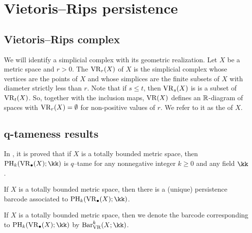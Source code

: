 
\section{Vietoris--Rips persistence}\label{s:preliminaries}


\subsection{Vietoris--Rips complex}\label{ss:vietoris-rips}

We will identify a simplicial complex with its geometric realization.
Let $X$ be a metric space and $r > 0$.
The  $\operatorname{VR}_r(X)$ of $X$ is the simplicial complex whose vertices are the points of $X$ and whose simplices are the finite subsets of $X$ with diameter strictly less than $r$.
Note that if $s \leq t$, then $\operatorname{VR}_s(X)$ is is a subset of $\operatorname{VR}_t(X)$.
So, together with the inclusion maps, $\operatorname{VR}(X)$ defines an $\mathbb{R}$-diagram of spaces with $\operatorname{VR}_r(X) = \emptyset$ for non-positive values of $r$.
We refer to it as the  of $X$.

\subsection{q-tameness results}

\begin{remark}
	In \cite{bib11}, it is proved that if $X$ is a totally bounded metric space, then $\mathrm{PH}_k(\VR_{\bullet}(X); \kk)$ is $q$–tame for any nonnegative integer $k \geq 0$ and any field $\kk$.
\end{remark}

\begin{theorem}
	If $X$ is a totally bounded metric space, then there is a (unique) persistence barcode associated to $\mathrm{PH}_k(\VR_{\bullet}(X); \kk)$.
\end{theorem}

If $X$ is a totally bounded metric space, then we denote the barcode corresponding to $\mathrm{PH}_k(\VR_{\bullet}(X); \kk)$ by $\barc_{\VR}^k(X; \kk)$.



